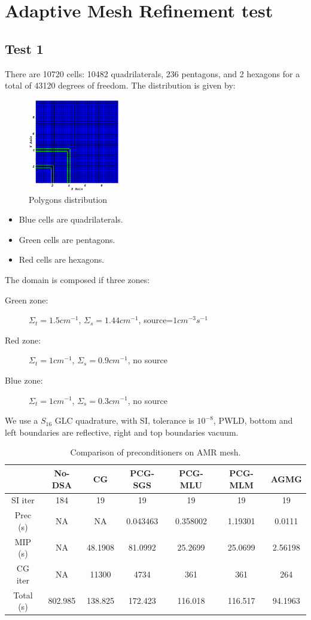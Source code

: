 \section{Adaptive Mesh Refinement test}
\subsection{Test 1}
There are 10720 cells: 10482 quadrilaterals, 236 pentagons, and 2 hexagons 
for a total of 43120 degrees of freedom. The distribution is given by:
\begin{figure}[H]
  \centering
  \includegraphics[width=4cm]{polygon_amr}
  \caption{Polygons distribution}
\end{figure}
\begin{itemize}
  \item Blue cells are quadrilaterals.
  \item Green cells are pentagons.
  \item Red cells are hexagons.
\end{itemize}
The domain is composed if three zones:
\begin{description}
  \item[Green zone:] $\Sigma_t=1.5cm^{-1}$, $\Sigma_s=1.44cm^{-1}$,
    source=$1cm^{-3}s^{-1}$
  \item[Red zone:] $\Sigma_t=1cm^{-1}$, $\Sigma_s=0.9cm^{-1}$, no source
  \item[Blue zone:] $\Sigma_t=1cm^{-1}$, $\Sigma_s=0.3cm^{-1}$, no source
\end{description}
We use a $S_{16}$ GLC quadrature, with SI, tolerance is $10^{-8}$, PWLD,
bottom and left boundaries are reflective, right and top boundaries vacuum.
\begin{table}[H]
  \caption{Comparison of preconditioners on AMR mesh.}
  \begin{center}
    \begin{tabular}{|c|c|c|c|c|c|c|}
      \hline
       & No-DSA & CG & PCG-SGS & PCG-MLU & PCG-MLM & AGMG \\
      \hline
      SI iter    & 184     & 19      & 19       & 19      & 19       & 19 \\
      Prec (s)   & NA      & NA      & 0.043463 & 0.358002 & 1.19301 & 0.0111\\
      MIP (s)    & NA      & 48.1908 & 81.0992  & 25.2699 & 25.0699  & 
      2.56198\\
      CG iter    & NA      & 11300   & 4734     & 361     & 361      & 264 \\
      Total (s)  & 802.985 & 138.825 & 172.423  & 116.018 & 116.517  &
      94.1963\\
      \hline
    \end{tabular}
  \end{center}
\end{table}
